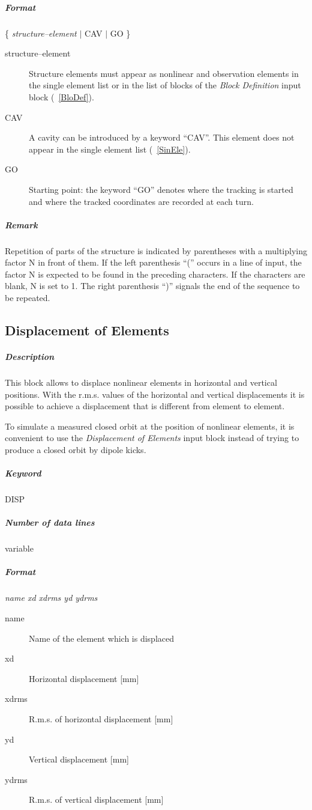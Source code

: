 \subparagraph{Format} \{ {\em structure--element} \/$\vert$ CAV
$\vert$ GO \}

\begin{description}
\item [structure--element] Structure elements must appear as nonlinear
  and observation elements in the single element list or in the list
  of blocks of the {\em Block Definition} \/input block
  (~\ref{BloDef}).
\item [CAV] A cavity can be introduced by a keyword ``CAV''.
  This element does not appear in the single element list
  (~\ref{SinEle}).
\item [GO] Starting point: the keyword ``GO'' denotes where the
  tracking is started and where the tracked coordinates are recorded
  at each turn.
\end{description}

\subparagraph{Remark} Repetition of parts of the structure is
indicated by parentheses with a multiplying factor N in front of them.
If the left parenthesis ``('' occurs in a line of input, the factor N
is expected to be found in the preceding characters. If the characters
are blank, N is set to 1.  The right parenthesis ``)'' signals the end
of the sequence to be repeated.

\subsection{Displacement of Elements} \label{DisEle}

\subparagraph{Description} This block allows to displace nonlinear
elements in horizontal and vertical positions.  With the r.m.s. values of
the horizontal and vertical displacements it is possible to achieve a
displacement that is different from element to element.

To simulate a measured closed orbit at the position of nonlinear
elements, it is convenient to use the {\em Displacement of Elements}
\/input block instead of trying to produce a closed orbit by dipole
kicks.

\subparagraph{Keyword} DISP \subparagraph{Number of data lines}
variable

\subparagraph{Format} {\em name xd xdrms yd ydrms}

\begin{description}
\item [name] Name of the element which is displaced
\item [xd] Horizontal displacement [mm]
\item [xdrms] R.m.s. of horizontal displacement [mm]
\item [yd] Vertical displacement [mm]
\item [ydrms] R.m.s. of vertical displacement [mm]
\end{description}

